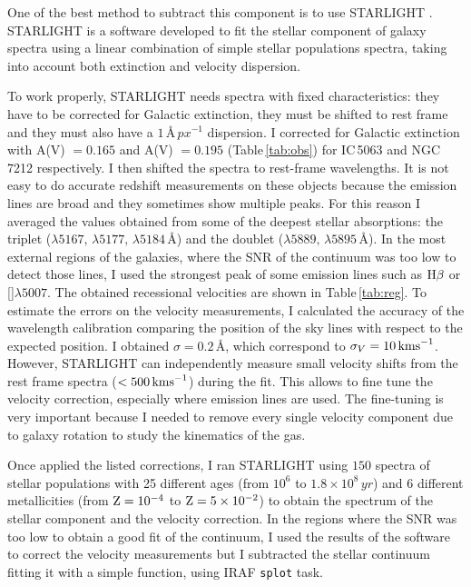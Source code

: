 \documentclass[../thesis.tex]{subfiles}
\begin{document}
One of the best method to subtract this component is to use STARLIGHT \citep{Fernandes05, Mateus06, Fernandes07}.
STARLIGHT is a software developed to fit the stellar component of galaxy spectra using a linear combination of simple stellar populations spectra, taking into account both extinction and velocity dispersion.

To work properly, STARLIGHT needs spectra with fixed characteristics: they have to be corrected for Galactic extinction, they must be shifted to rest frame and they must also have a $1\,\si{\angstrom\,px^{-1}}$ dispersion.
I corrected for Galactic extinction with A(V) $= 0.165$ and A(V) $=0.195$ (Table\,\ref{tab:obs}) for IC\,5063 and NGC\,7212 respectively. 
I then shifted the spectra to rest-frame wavelengths.
It is not easy to do accurate redshift measurements on these objects because the emission lines are broad and they sometimes show multiple peaks. 
For this reason I averaged the values obtained from some of the deepest stellar absorptions: the  triplet ($\lambda5167,\,\lambda5177,\,\lambda5184$\,\AA) and the  doublet ($\lambda5889,\,\lambda5895$\,\AA).
In the most external regions of the galaxies, where the SNR of the continuum was too low to detect those lines, I  used the strongest peak of some emission lines such as $\Hb$ or []$\lambda5007$.
The obtained recessional velocities are shown in Table\,\ref{tab:reg}.
To estimate the errors on the velocity measurements, I calculated the accuracy of the wavelength calibration comparing the position of the sky lines with respect to the expected position.
I obtained $\sigma = 0.2\,\si{\angstrom}$, which correspond to $\sigma_V=10\,\si{\kms}$.
However, STARLIGHT can independently measure small velocity shifts from the rest frame spectra ($< 500\,\si{\kms}$) during the fit.
This allows to fine tune the velocity correction, especially where emission lines are used.
The fine-tuning is very important because I needed to remove every single velocity component due to galaxy rotation to study the kinematics of the gas.

Once applied the listed corrections, I ran STARLIGHT using $150$ spectra of stellar populations with 25 different ages (from $10^6$ to $1.8\times10^8\,\si{yr}$) and 6 different metallicities (from $\rm Z=10^{-4}$ to $\rm Z=5\times 10^{-2}$) to obtain the spectrum of the stellar component and the velocity correction.
In the regions where the SNR was too low to obtain a good fit of the continuum, I used the results of the software to correct the velocity measurements but I subtracted the stellar continuum fitting it with a simple function, using IRAF \verb!splot! task.
\end{document}
